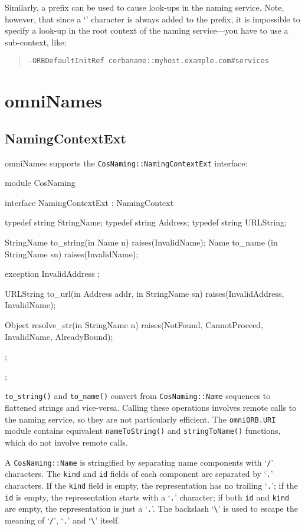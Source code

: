 \documentclass[11pt,twoside,a4paper]{book}
\newcommand{\type}[1]{\texttt{#1}}
\newcommand{\intf}[1]{\texttt{#1}}
\newcommand{\module}[1]{\texttt{#1}}
\newcommand{\code}[1]{\texttt{#1}}
\newcommand{\op}[1]{\texttt{#1()}}
\newcommand{\cmdline}[1]{\texttt{#1}}
\newcommand{\corbauri}{\begingroup \urlstyle{tt}\Url}
\begin{document}
Similarly, a \corbauri{corbaname} prefix can be used to cause
look-ups in the naming service. Note, however, that since a
`\corbauri{/}' character is always added to the prefix, it is
impossible to specify a look-up in the root context of the naming
service---you have to use a sub-context, like:

\begin{quote}
\cmdline{-ORBDefaultInitRef corbaname::myhost.example.com\#services}
\end{quote}



\section{omniNames}

\subsection{NamingContextExt}

omniNames supports the \intf{CosNaming::NamingContextExt} interface:

\begin{idllisting}
module CosNaming {
  interface NamingContextExt : NamingContext {
    typedef string StringName;
    typedef string Address;
    typedef string URLString;

    StringName  to_string(in Name n)        raises(InvalidName);
    Name        to_name  (in StringName sn) raises(InvalidName);

    exception InvalidAddress {};

    URLString   to_url(in Address addr, in StringName sn)
      raises(InvalidAddress, InvalidName);

    Object      resolve_str(in StringName n)
      raises(NotFound, CannotProceed, InvalidName, AlreadyBound);
  };
};
\end{idllisting}

\op{to\_string} and \op{to\_name} convert from \type{CosNaming::Name}
sequences to flattened strings and vice-versa.  Calling these
operations involves remote calls to the naming service, so they are
not particularly efficient. The \module{omniORB.URI} module contains
equivalent \op{nameToString} and \op{stringToName} functions, which do
not involve remote calls.

A \type{CosNaming::Name} is stringified by separating name components
with `\texttt{/}' characters. The \code{kind} and \code{id} fields of
each component are separated by `\texttt{.}' characters. If the
\code{kind} field is empty, the representation has no trailing
`\texttt{.}'; if the \code{id} is empty, the representation starts
with a `\texttt{.}' character; if both \texttt{id} and \texttt{kind}
are empty, the representation is just a `\texttt{.}'. The backslash
`\texttt{\textbackslash}' is used to escape the meaning of
`\texttt{/}', `\texttt{.}' and `\texttt{\textbackslash}' itself.
\end{document}
